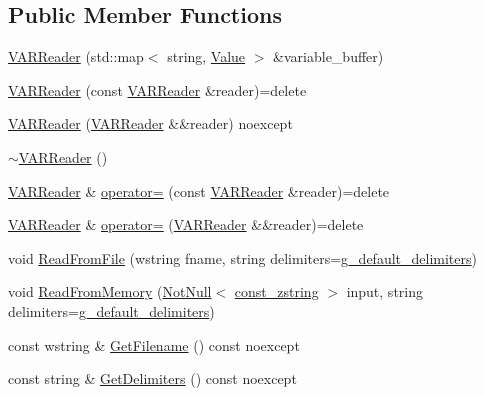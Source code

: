 \subsection*{Public Member Functions}
\begin{DoxyCompactItemize}
\item 
\mbox{\hyperlink{classmage_1_1loader_1_1_v_a_r_reader_ae06b2b97d9a0ce16047b0c8cfcd4a73f}{V\+A\+R\+Reader}} (std\+::map$<$ string, \mbox{\hyperlink{namespacemage_aa1fe0628487e0706e44efdc62dbdb3a2}{Value}} $>$ \&variable\+\_\+buffer)
\item 
\mbox{\hyperlink{classmage_1_1loader_1_1_v_a_r_reader_ab4ab4d94c90a2797ae40e54e0dd7c127}{V\+A\+R\+Reader}} (const \mbox{\hyperlink{classmage_1_1loader_1_1_v_a_r_reader}{V\+A\+R\+Reader}} \&reader)=delete
\item 
\mbox{\hyperlink{classmage_1_1loader_1_1_v_a_r_reader_aeefac440730fc89b16afa19695c956d5}{V\+A\+R\+Reader}} (\mbox{\hyperlink{classmage_1_1loader_1_1_v_a_r_reader}{V\+A\+R\+Reader}} \&\&reader) noexcept
\item 
\mbox{\hyperlink{classmage_1_1loader_1_1_v_a_r_reader_acd3bbd51ccc774d2f74a4520b6143990}{$\sim$\+V\+A\+R\+Reader}} ()
\item 
\mbox{\hyperlink{classmage_1_1loader_1_1_v_a_r_reader}{V\+A\+R\+Reader}} \& \mbox{\hyperlink{classmage_1_1loader_1_1_v_a_r_reader_a78d39071ad5103c848782ff82be397bb}{operator=}} (const \mbox{\hyperlink{classmage_1_1loader_1_1_v_a_r_reader}{V\+A\+R\+Reader}} \&reader)=delete
\item 
\mbox{\hyperlink{classmage_1_1loader_1_1_v_a_r_reader}{V\+A\+R\+Reader}} \& \mbox{\hyperlink{classmage_1_1loader_1_1_v_a_r_reader_a0da01229f594cb701b3e20d53be9d16e}{operator=}} (\mbox{\hyperlink{classmage_1_1loader_1_1_v_a_r_reader}{V\+A\+R\+Reader}} \&\&reader)=delete
\item 
void \mbox{\hyperlink{classmage_1_1loader_1_1_v_a_r_reader_a6ee0c53351656ac4cd92db1d7c372cff}{Read\+From\+File}} (wstring fname, string delimiters=\mbox{\hyperlink{namespacemage_aa161198415efd9349da6187663250aea}{g\+\_\+default\+\_\+delimiters}})
\item 
void \mbox{\hyperlink{classmage_1_1loader_1_1_v_a_r_reader_a5aa9068792817b6d6dc840a44b788159}{Read\+From\+Memory}} (\mbox{\hyperlink{namespacemage_a8769f9d670d6b585ea306cb1062af94b}{Not\+Null}}$<$ \mbox{\hyperlink{namespacemage_abfd9206dc607ceb5d13ec68bf075a5c0}{const\+\_\+zstring}} $>$ input, string delimiters=\mbox{\hyperlink{namespacemage_aa161198415efd9349da6187663250aea}{g\+\_\+default\+\_\+delimiters}})
\item 
const wstring \& \mbox{\hyperlink{classmage_1_1loader_1_1_v_a_r_reader_a682ed8030c99a62d4409a01f9efa6d6b}{Get\+Filename}} () const noexcept
\item 
const string \& \mbox{\hyperlink{classmage_1_1loader_1_1_v_a_r_reader_aa00e1e27b614e11ec9f70e52d0bac551}{Get\+Delimiters}} () const noexcept
\end{DoxyCompactItemize}
